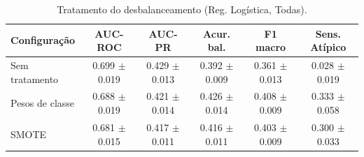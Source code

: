\begin{table}[ht]
\centering
\caption{Tratamento do desbalanceamento (Reg. Logística, Todas).}
\label{tab:abl_imb}
\small
\begin{tabular}{lccccc}
\hline
Configuração & AUC-ROC & AUC-PR & Acur. bal. & F1 macro & Sens. Atípico \\
\hline
Sem tratamento & 0.699 $\pm$ 0.019 & 0.429 $\pm$ 0.013 & 0.392 $\pm$ 0.009 & 0.361 $\pm$ 0.013 & 0.028 $\pm$ 0.019 \\
Pesos de classe & 0.688 $\pm$ 0.019 & 0.421 $\pm$ 0.014 & 0.426 $\pm$ 0.014 & 0.408 $\pm$ 0.009 & 0.333 $\pm$ 0.058 \\
SMOTE & 0.681 $\pm$ 0.015 & 0.417 $\pm$ 0.011 & 0.416 $\pm$ 0.011 & 0.403 $\pm$ 0.009 & 0.300 $\pm$ 0.033 \\
\hline
\end{tabular}
\end{table}